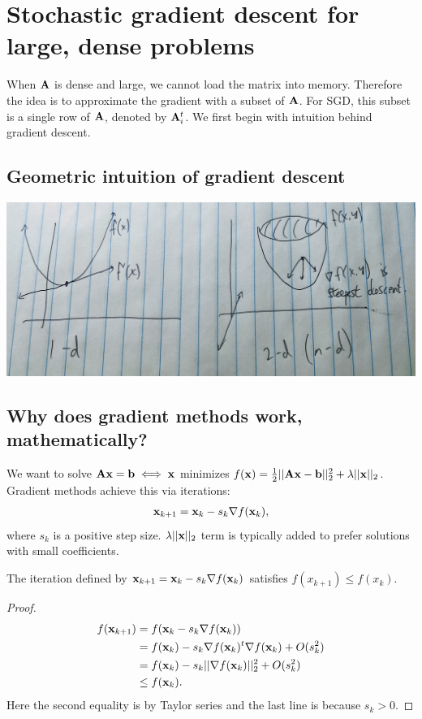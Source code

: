 \documentclass[./some_latex_template.tex]{subfiles}
\begin{document}
\section{Stochastic gradient descent for large, dense problems}

When $\mathbf{A}$ is dense and large, we cannot load the matrix into memory. Therefore the idea is to approximate the gradient with a subset of $\mathbf{A}$. For SGD, this subset is a single row of $\mathbf{A}$, denoted by $\mathbf{A}_i^t$. We first begin with intuition behind gradient descent. 

\subsection{Geometric intuition of gradient descent}

\begin{center}
	\includegraphics[scale=0.1]{gradient_illustration.jpg}
\end{center}

\subsection{Why does gradient methods work, mathematically?}

We want to solve $\mathbf{A}\mathbf{x} = \mathbf{b} \iff \mathbf{x}$ minimizes $f(\mathbf{x}) = \frac{1}{2}||\mathbf{A}\mathbf{x} - \mathbf{b}||^2_2 + \lambda||\mathbf{x}||_2$. Gradient methods achieve this via iterations:
\begin{align}\label{gradient_method_works}
	\mathbf{x}_{k + 1} = \mathbf{x}_k - s_k \nabla f(\mathbf{x}_k),
\end{align}
where $s_k$ is a positive step size. $\lambda ||\mathbf{x}||_2$ term is typically added to prefer solutions with small coefficients. 

\begin{theorembox}{}{}
The iteration defined by $\mathbf{x}_{k + 1} = \mathbf{x}_k - s_k \nabla f(\mathbf{x}_k)$ satisfies $f(x_{k + 1}) \le f(x_k)$. 
\end{theorembox}
\begin{proof}
	\begin{align*}
		f(\mathbf{x}_{k + 1}) 
		&= f(\mathbf{x}_k - s_k\nabla f(\mathbf{x}_k)) \\
		&= f(\mathbf{x}_k) - s_k\nabla f(\mathbf{x}_k)^t\nabla f(\mathbf{x}_k) + O(s_k^2)\\
		&= f(\mathbf{x}_k) - s_k ||\nabla f(\mathbf{x}_k)||_2^2 + O(s_k^2)\\
		&\le f(\mathbf{x}_k).
	\end{align*}
Here the second equality is by Taylor series and the last line is because $s_k > 0$. 
\end{proof}
\end{document}
